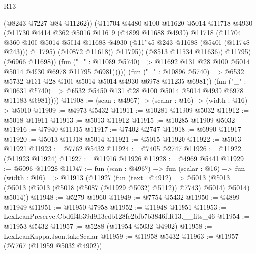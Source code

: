 \begin{lexlean}{R13}
\begin{coremodule}
                              (@8243 @7227 @84 @11262))
                            (@11704
                              @4480
                              @100
                              @11620
                              @5014
                              @11718
                              @4930
                              (@11730
                                @4414
                                @362
                                @5016
                                @11619
                                (@4899 @11688 @4930)
                                @11718
                                (@11704
                                  @360
                                  @100
                                  @5014
                                  @5014
                                  @11688
                                  @4930
                                  (@11745 @243 @11688 (@5401 (@11748 @243)))
                                  @11795)
                                (@10872 @11618))
                              @11795))
                          (@8513 @11634 @11636))
                        @11795)
                      (@6966 @11698))
                    (fun ("_" : @11089 @5740) =>
                    @11692 @131 @28 @100 @5014 @5014 @4930 @6978 @11795 @6981)))))
            (fun ("_" : @10896 @5740) =>
            @6532 @5732 @131 @28 @100 @5014 @5014 @4930 @6978 @11235 @6981))
          (fun ("_" : @10631 @5740) =>
          @6532 @5450 @131 @28 @100 @5014 @5014 @4930 @6978 @11183 @6981))))
@11908 := (scan : @4967) -> (scalar : @16) -> (width : @16) -> @5010
@11909 := @4973 @5432
@11911 := @10281 @11909 @5032
@11912 := @5018 @11911
@11913 := @5013 @11912
@11915 := @10285 @11909 @5032
@11916 := @7940 @11915
@11917 := @7402 @2747
@11918 := @6990 @11917
@11920 := @5013 @11918 @5014
@11921 := @5015 @11920
@11922 := @5013 @11921
@11923 := @7762 @5432
@11924 := @7405 @2747
@11926 := @11922 (@11923 @11924)
@11927 := @11916 @11926
@11928 := @4969 @5441
@11929 := @5096 @11928
@11947 := fun (scan : @4967) =>
  fun (scalar : @16) =>
  fun (width : @16) =>
  @11913
    (@11927
      (fun (text : @4912) =>
      @5013 (@5013 (@5013 (@5013 (@5018 (@5087 (@11929 @5032) @5112)) @7743) @5014) @5014) @5014))
@11948 := @5279 @1960
@11949 := @7754 @5432
@11950 := @4899 @11949
@11951 := @11950 @7958
@11952 := @11948 @11951
@11953 := LexLeanPreserve.Cbd6f4b39d9ff3edb128fe2bfb7b3846f.R13.__fits_46
@11954 := @11953 @5432
@11957 := @5288 (@11954 @5032 @4902)
@11958 := LexLeanKappa.Json.takeScalar
@11959 := @11958 @5432
@11963 := @11957 (@7767 (@11959 @5032 @4902))

\end{coremodule}
\end{lexlean}
